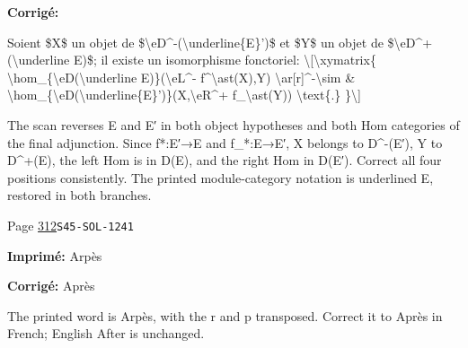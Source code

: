 \begin{description}
\par\noindent\textbf{Corrigé:} {\footnotesize\ttfamily\raggedright Soient \$X\$ un objet de \$\textbackslash{}\allowbreak{}eD\textasciicircum{}\allowbreak{}-\allowbreak{}(\allowbreak{}\textbackslash{}\allowbreak{}underline\{\allowbreak{}E\}\allowbreak{}')\allowbreak{}\$ et \$Y\$ un objet de  \$\textbackslash{}\allowbreak{}eD\textasciicircum{}\allowbreak{}+\allowbreak{}(\allowbreak{}\textbackslash{}\allowbreak{}underline E)\allowbreak{}\$; il existe un isomorphisme fonctoriel:  \textbackslash{}\allowbreak{}[\allowbreak{}\textbackslash{}\allowbreak{}xymatrix\{\allowbreak{}   \textbackslash{}\allowbreak{}hom\_\allowbreak{}\{\allowbreak{}\textbackslash{}\allowbreak{}eD(\allowbreak{}\textbackslash{}\allowbreak{}underline E)\allowbreak{}\}\allowbreak{}(\allowbreak{}\textbackslash{}\allowbreak{}eL\textasciicircum{}\allowbreak{}-\allowbreak{} f\textasciicircum{}\allowbreak{}\textbackslash{}\allowbreak{}ast(\allowbreak{}X)\allowbreak{},\allowbreak{}Y)\allowbreak{} \textbackslash{}\allowbreak{}ar[\allowbreak{}r]\allowbreak{}\textasciicircum{}\allowbreak{}-\allowbreak{}\textbackslash{}\allowbreak{}sim      \& \textbackslash{}\allowbreak{}hom\_\allowbreak{}\{\allowbreak{}\textbackslash{}\allowbreak{}eD(\allowbreak{}\textbackslash{}\allowbreak{}underline\{\allowbreak{}E\}\allowbreak{}')\allowbreak{}\}\allowbreak{}(\allowbreak{}X,\allowbreak{}\textbackslash{}\allowbreak{}eR\textasciicircum{}\allowbreak{}+\allowbreak{} f\_\allowbreak{}\textbackslash{}\allowbreak{}ast(\allowbreak{}Y)\allowbreak{})\allowbreak{} \textbackslash{}\allowbreak{}text\{\allowbreak{}.\}\allowbreak{} \}\allowbreak{}\textbackslash{}\allowbreak{}]\allowbreak{}}
\par\noindent The scan reverses E and E′ in both object hypotheses and both Hom categories of the final adjunction. Since f*:E′→E and f\_*:E→E′, X belongs to D\textasciicircum{}-(E′), Y to D\textasciicircum{}+(E), the left Hom is in D(E), and the right Hom in D(E′). Correct all four positions consistently. The printed module-category notation is underlined E, restored in both branches.
\smallskip
\item[\hypertarget{apparatus:FR-0311}{311}] Page \hyperlink{printpage:fr:312}{312}\quad\texttt{S45-SOL-1241}
\par\noindent\textbf{Imprimé:} Arpès
\par\noindent\textbf{Corrigé:} Après
\par\noindent The printed word is Arpès, with the r and p transposed. Correct it to Après in French; English After is unchanged.
\smallskip
\end{description}
\endgroup
\fi
